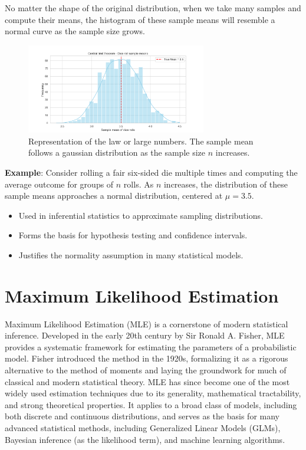 \documentclass{book}
\begin{document}
No matter the shape of the original distribution, when we take many samples and compute their means, the histogram of these sample means will resemble a normal curve as the sample size grows.

\begin{figure}[ht]
    \centering
    \includegraphics[width=0.7\textwidth]{figures/chapter3/central_limit_theorem.png}
    \caption{Representation of the law or large numbers. The sample mean follows a gaussian distribution as the sample size $n$ increases.}
    \label{fig:random}
\end{figure}

\textbf{Example}: Consider rolling a fair six-sided die multiple times and computing the average outcome for groups of $n$ rolls. As $n$ increases, the distribution of these sample means approaches a normal distribution, centered at $\mu=3.5$.\\

\begin{itemize}
    \item Used in inferential statistics to approximate sampling distributions.
    \item Forms the basis for hypothesis testing and confidence intervals.
    \item Justifies the normality assumption in many statistical models.
\end{itemize}

\newpage

\section{Maximum Likelihood Estimation}

Maximum Likelihood Estimation (MLE) is a cornerstone of modern statistical inference. Developed in the early 20th century by Sir Ronald A. Fisher, MLE provides a systematic framework for estimating the parameters of a probabilistic model. Fisher introduced the method in the 1920s, formalizing it as a rigorous alternative to the method of moments and laying the groundwork for much of classical and modern statistical theory.
MLE has since become one of the most widely used estimation techniques due to its generality, mathematical tractability, and strong theoretical properties. It applies to a broad class of models, including both discrete and continuous distributions, and serves as the basis for many advanced statistical methods, including Generalized Linear Models (GLMs), Bayesian inference (as the likelihood term), and machine learning algorithms.
\end{document}
